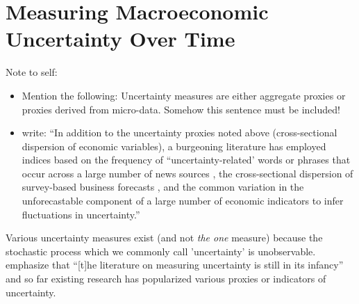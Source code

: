 \documentclass[a4paper,11pt,listof=nochaptergap,oneside,pointednumbers,bibtotoc,bigheadings,liststotoc]{scrbook}
\theoremstyle{mysatz}
\theoremstyle{mydefinition}
\theoremstyle{mybemerkung}
\begin{document}
\section{Measuring Macroeconomic Uncertainty Over Time}
\label{sec:MeasuringUncertainty}
\begingroup
    \fontsize{8pt}{12pt}\selectfont
    Note to self:
\begin{itemize}
	\item  Mention the following: Uncertainty measures are either aggregate proxies or proxies derived from micro-data. Somehow this sentence must be included! 
	\item \citet{gilchristetal:14} write: ``In addition to the uncertainty proxies noted above (cross-sectional dispersion of economic variables), a burgeoning literature has employed indices based on the frequency of ``uncertainty-related' words or phrases that occur across a large number of news sources \citep{bakeretal:15}, the cross-sectional dispersion of survey-based business forecasts \citep{bachmannetal:13}, and the common variation in the unforecastable component of a large number of economic indicators \citep{juradoetal:15} to infer fluctuations in uncertainty.''
\end{itemize}
\endgroup


Various uncertainty measures exist (and not \textit{the one} measure) because the stochastic process which we commonly call 'uncertainty' is unobservable. \citet[p. 1182]{juradoetal:15} emphasize that ``[t]he literature on measuring uncertainty is still in its infancy'' and so far existing research has popularized various proxies or indicators of uncertainty.
\end{document}
